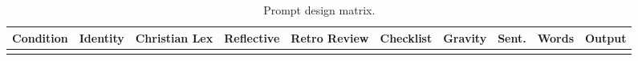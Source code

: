 \documentclass[
]{article}
\begin{document}
\begin{longtable}[]{@{}
  >{\raggedright\arraybackslash}p{}
  >{\raggedright\arraybackslash}p{}
  >{\raggedright\arraybackslash}p{}
  >{\raggedright\arraybackslash}p{}
  >{\raggedright\arraybackslash}p{}
  >{\raggedright\arraybackslash}p{}
  >{\raggedright\arraybackslash}p{}
  >{\raggedleft\arraybackslash}p{}
  >{\raggedleft\arraybackslash}p{}
  >{\raggedright\arraybackslash}p{}@{}}
\caption{Prompt design matrix.}\tabularnewline
\toprule\noalign{}
\begin{minipage}[b]{\linewidth}\raggedright
Condition
\end{minipage} & \begin{minipage}[b]{\linewidth}\raggedright
Identity
\end{minipage} & \begin{minipage}[b]{\linewidth}\raggedright
Christian Lex
\end{minipage} & \begin{minipage}[b]{\linewidth}\raggedright
Reflective
\end{minipage} & \begin{minipage}[b]{\linewidth}\raggedright
Retro Review
\end{minipage} & \begin{minipage}[b]{\linewidth}\raggedright
Checklist
\end{minipage} & \begin{minipage}[b]{\linewidth}\raggedright
Gravity
\end{minipage} & \begin{minipage}[b]{\linewidth}\raggedleft
Sent.
\end{minipage} & \begin{minipage}[b]{\linewidth}\raggedleft
Words
\end{minipage} & \begin{minipage}[b]{\linewidth}\raggedright
Output
\end{minipage} \\
\midrule\noalign{}
\endfirsthead
\toprule\noalign{}
\begin{minipage}[b]{\linewidth}\raggedright

\end{minipage}
\end{longtable}
\end{document}
